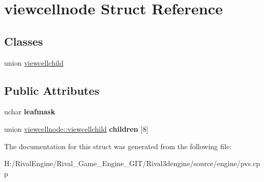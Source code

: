 \hypertarget{structviewcellnode}{}\section{viewcellnode Struct Reference}
\label{structviewcellnode}
\subsection*{Classes}
\begin{DoxyCompactItemize}
\item 
union \hyperlink{unionviewcellnode_1_1viewcellchild}{viewcellchild}
\end{DoxyCompactItemize}
\subsection*{Public Attributes}
\begin{DoxyCompactItemize}
\item 
\mbox{\label{structviewcellnode_aa25de5f26a6349f853676cfdae7d9fc5}} 
uchar {\bfseries leafmask}
\item 
\mbox{\label{structviewcellnode_ab8c552ebe22e628c3a1260a0dd437506}} 
union \hyperlink{unionviewcellnode_1_1viewcellchild}{viewcellnode\+::viewcellchild} {\bfseries children} \mbox{[}8\mbox{]}
\end{DoxyCompactItemize}


The documentation for this struct was generated from the following file\+:\begin{DoxyCompactItemize}
\item 
H\+:/\+Rival\+Engine/\+Rival\+\_\+\+Game\+\_\+\+Engine\+\_\+\+G\+I\+T/\+Rival3dengine/source/engine/pvs.\+cpp\end{DoxyCompactItemize}
